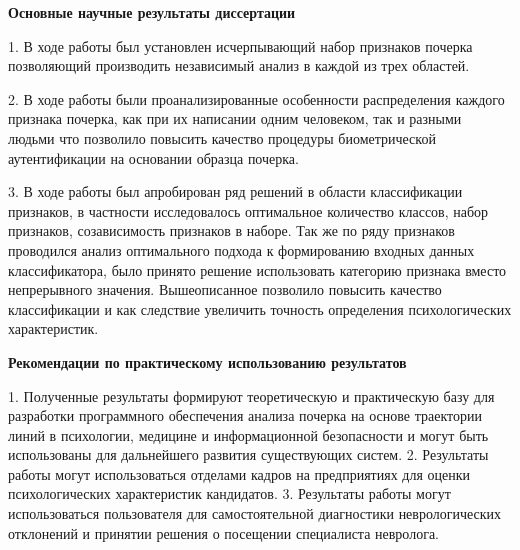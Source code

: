 \bigskip
\bigskip
\textbf{Основные научные результаты диссертации}
\bigskip

1. В ходе работы был установлен исчерпывающий набор признаков почерка позволяющий производить независимый анализ в каждой из трех областей.

2. В ходе работы были проанализированные особенности распределения каждого признака почерка, как при их написании одним человеком, так и разными людьми что позволило повысить качество процедуры биометрической аутентификации на основании образца почерка.

3. В ходе работы был апробирован ряд решений в области классификации признаков, в частности исследовалось оптимальное количество классов, набор признаков, созависимость признаков в наборе. Так же по ряду признаков проводился анализ оптимального подхода к формированию входных данных классификатора, было принято решение использовать категорию признака вместо непрерывного значения. Вышеописанное позволило повысить качество классификации и как следствие увеличить точность определения психологических характеристик.

\bigskip
\textbf{Рекомендации по практическому использованию результатов}
\bigskip

1.	Полученные результаты формируют теоретическую и практическую базу для разработки программного обеспечения анализа почерка на основе траектории линий в психологии, медицине и информационной безопасности и могут быть использованы для дальнейшего развития существующих систем.
2.	Результаты работы могут использоваться отделами кадров на предприятиях для оценки психологических характеристик кандидатов.
3.	Результаты работы могут использоваться пользователя для самостоятельной диагностики неврологических отклонений и принятии решения о посещении специалиста невролога.